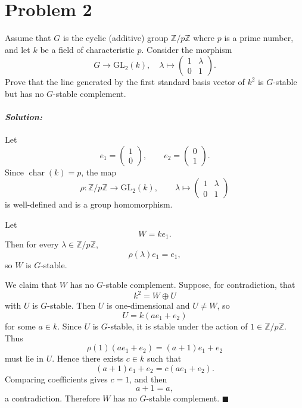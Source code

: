 \documentclass[12pt, a4paper]{article}
\theoremstyle{remark}
\newenvironment{solution}
  {\paragraph{\textit{Solution:}}\par\medskip}
  {\hfill$\blacksquare$\vspace{0.1cm}}
\begin{document}
\section*{Problem 2}
Assume that $G$ is the cyclic (additive) group $\mathbb{Z}/p\mathbb{Z}$ where $p$ is a prime number, and let $k$ be a field of characteristic $p$. 
Consider the morphism
$$
G \to \mathrm{GL}_2(k), \quad \lambda \mapsto \begin{pmatrix} 1 & \lambda \\ 0 & 1 \end{pmatrix}.
$$
Prove that the line generated by the first standard basis vector of $k^2$ is $G$-stable but has no $G$-stable complement.
\begin{solution}
    Let
\[
e_1=\begin{pmatrix}1\\0\end{pmatrix},
\qquad
e_2=\begin{pmatrix}0\\1\end{pmatrix}.
\]
Since \(\operatorname{char}(k)=p\), the map
\[
\rho:\mathbb Z/p\mathbb Z\to \mathrm{GL}_2(k),
\qquad
\lambda\mapsto
\begin{pmatrix}
1&\lambda\\
0&1
\end{pmatrix}
\]
is well-defined and is a group homomorphism.

Let
\[
W=ke_1.
\]
Then for every \(\lambda\in \mathbb Z/p\mathbb Z\),
\[
\rho(\lambda)e_1=e_1,
\]
so \(W\) is \(G\)-stable.

We claim that \(W\) has no \(G\)-stable complement. Suppose, for contradiction, that
\[
k^2=W\oplus U
\]
with \(U\) is \(G\)-stable. Then \(U\) is one-dimensional and \(U\neq W\), so
\[
U=k(ae_1+e_2)
\]
for some \(a\in k\). Since \(U\) is \(G\)-stable, it is stable under the action of \(1\in \mathbb Z/p\mathbb Z\). Thus
\[
\rho(1)(ae_1+e_2)=(a+1)e_1+e_2
\]
must lie in \(U\). Hence there exists \(c\in k\) such that
\[
(a+1)e_1+e_2=c(ae_1+e_2).
\]
Comparing coefficients gives \(c=1\), and then
\[
a+1=a,
\]
a contradiction. Therefore \(W\) has no \(G\)-stable complement.
\end{solution}
\end{document}
